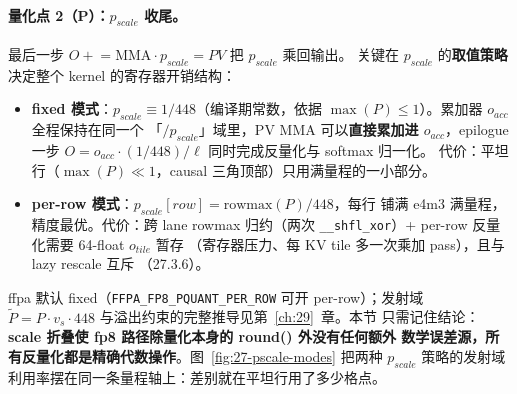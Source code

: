 \paragraph{量化点 2（P）：$p_{scale}$ 收尾。}
最后一步 $O \mathrel{+}= \mathrm{MMA} \cdot p_{scale} = PV$ 把 $p_{scale}$ 乘回输出。
关键在 $p_{scale}$ 的\textbf{取值策略}决定整个 kernel 的寄存器开销结构：
\begin{itemize}[itemsep=2pt,topsep=2pt]
  \item \textbf{fixed 模式}：$p_{scale} \equiv 1/448$（编译期常数，依据
        $\max(P) \le 1$）。累加器 $o_{acc}$ 全程保持在同一个
        「$/p_{scale}$」域里，PV MMA 可以\textbf{直接累加进 $o_{acc}$}，epilogue
        一步 $O = o_{acc} \cdot (1/448) / \ell$ 同时完成反量化与 softmax 归一化。
        代价：平坦行（$\max(P) \ll 1$，causal 三角顶部）只用满量程的一小部分。
  \item \textbf{per-row 模式}：$p_{scale}[row] = \mathrm{rowmax}(P)/448$，每行
        铺满 e4m3 满量程，精度最优。代价：跨 lane rowmax 归约（两次
        \texttt{\_\_shfl\_xor}）+ per-row 反量化需要 64-float $o_{tile}$ 暂存
        （寄存器压力、每 KV tile 多一次乘加 pass），且与 lazy rescale 互斥
        （27.3.6）。
\end{itemize}
ffpa 默认 fixed（\texttt{FFPA\_FP8\_PQUANT\_PER\_ROW} 可开 per-row）；发射域
$\tilde{P} = P \cdot v_s \cdot 448$ 与溢出约束的完整推导见第~\ref{ch:29}~章。本节
只需记住结论：\textbf{scale 折叠使 fp8 路径除量化本身的 round() 外没有任何额外
数学误差源，所有反量化都是精确代数操作}。图~\ref{fig:27-pscale-modes} 把两种
$p_{scale}$ 策略的发射域利用率摆在同一条量程轴上：差别就在平坦行用了多少格点。

